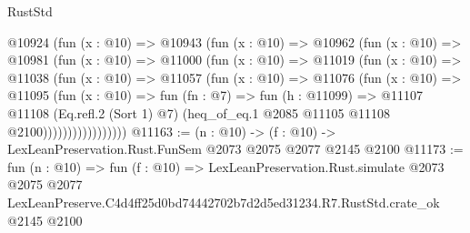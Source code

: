 \begin{lexlean}{RustStd}
\begin{coremodule}
              @10924
                (fun (x : @10) =>
                @10943
                  (fun (x : @10) =>
                  @10962
                    (fun (x : @10) =>
                    @10981
                      (fun (x : @10) =>
                      @11000
                        (fun (x : @10) =>
                        @11019
                          (fun (x : @10) =>
                          @11038
                            (fun (x : @10) =>
                            @11057
                              (fun (x : @10) =>
                              @11076
                                (fun (x : @10) =>
                                @11095
                                  (fun (x : @10) =>
                                  fun (fn : @7) =>
                                  fun (h : @11099) =>
                                  @11107
                                    @11108
                                    (Eq.refl.{2} (Sort 1) @7)
                                    (heq_of_eq.{1} @2085 @11105 @11108 @2100)))))))))))))))))
@11163 := (n : @10) -> (f : @10) -> LexLeanPreservation.Rust.FunSem @2073 @2075 @2077 @2145 @2100
@11173 := fun (n : @10) =>
  fun (f : @10) =>
  LexLeanPreservation.Rust.simulate
    @2073
    @2075
    @2077
    LexLeanPreserve.C4d4ff25d0bd74442702b7d2d5ed31234.R7.RustStd.crate_ok
    @2145
    @2100
\end{coremodule}
\end{lexlean}
